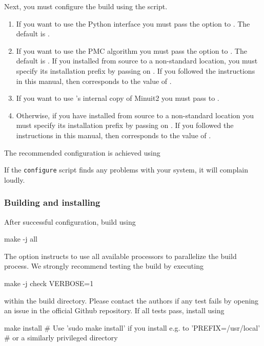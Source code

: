 Next, you must configure the \ctg build using the  script.
\begin{enumerate}
    \item If you want to use the \ctg Python interface you must pass the  option
    to . The default is .

    \item If you want to use the \ctg \gls{PMC} algorithm you must pass the  option
    to . The default is .
    If you installed  from source to a non-standard location,
    you must specify its installation prefix by passing on
    . If you followed the instructions in this
    manual, then  corresponds to the value of .

    \item If you want to use 's internal copy of Minuit2 you must
    pass  to .

    \item Otherwise, if you have installed  from source to a non-standard location
    you must specify its installation prefix by passing on
    . If you followed the instructions in this
    manual, then  corresponds to the value of .
\end{enumerate}
%
The recommended configuration is achieved using
If the \texttt{configure} script finds any problems with your system, it will complain loudly.\\

\subsubsection{Building and installing}
After successful configuration, build \ctg using
%
\begin{commandline}
make -j all
\end{commandline}
The  option instructs  to use all available processors to parallelize
the build process.
%
We strongly recommend testing the build by executing
%
\begin{commandline}
make -j check VERBOSE=1
\end{commandline}
%
within the build directory. Please contact the authors if any
test fails by opening an issue in the official
\ctg Github repository. If all tests pass, install \ctg using
\begin{commandline}
make install # Use 'sudo make install' if you install e.g. to 'PREFIX=/usr/local'
             # or a similarly privileged directory
\end{commandline}

